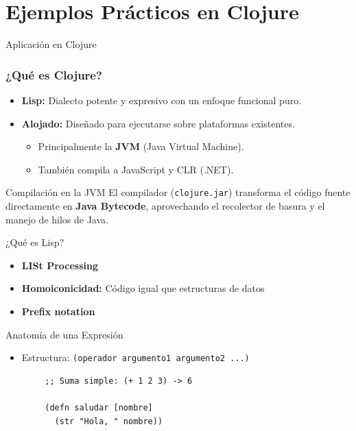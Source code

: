 \documentclass{beamer}
\begin{document}
\section{Ejemplos Prácticos en Clojure}

\begin{emptyframe}
    Aplicación en Clojure
\end{emptyframe}

\begin{frame}
    \frametitle{¿Qué es Clojure?}
    \begin{itemize}
        \item \textbf{Lisp:} Dialecto potente y expresivo con un enfoque funcional puro.
        \item \textbf{Alojado:} Diseñado para ejecutarse sobre plataformas existentes.
        \begin{itemize}
            \item Principalmente la \textbf{JVM} (Java Virtual Machine).
            \item También compila a JavaScript y CLR (.NET).
        \end{itemize}
    \end{itemize}

    \vspace{0.5cm}

    \begin{block}{Compilación en la JVM}
        El compilador (\texttt{clojure.jar}) transforma el código fuente directamente en \textbf{Java Bytecode}, aprovechando el recolector de basura y el manejo de hilos de Java.
    \end{block}

    \vspace{0.5cm}
\end{frame}

\begin{frame}[fragile]{¿Qué es Lisp?}
    \begin{itemize}
        \item \textbf{LISt Processing}
        \item \textbf{Homoiconicidad:} Código igual que estructuras de datos
        \item \textbf{Prefix notation}
    \end{itemize}

    \begin{exampleblock}{Anatomía de una Expresión}
        \begin{itemize}
            \item Estructura: \texttt{(operador argumento1 argumento2 ...)}
        \end{itemize}
        \begin{center}
        \begin{verbatim}
        ;; Suma simple: (+ 1 2 3) -> 6
        
        (defn saludar [nombre]
          (str "Hola, " nombre))
        \end{verbatim}
        \end{center}
    \end{exampleblock}

\end{frame}
\end{document}
